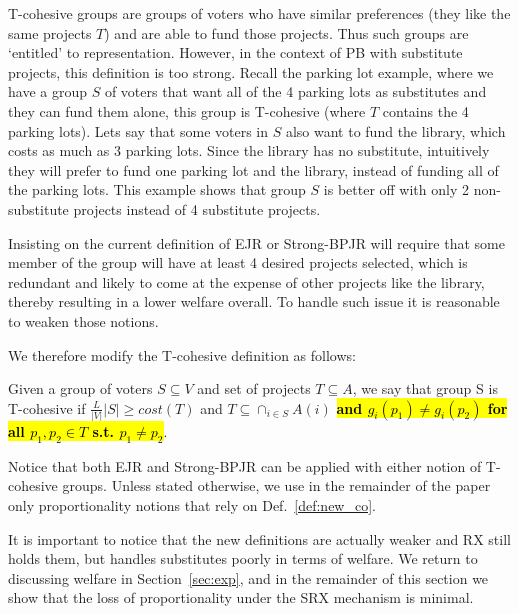 \documentclass[runningheads]{llncs}
\begin{document}
  T-cohesive groups  are  groups of voters who have similar preferences (they like the same projects $T$) and are able to  fund those projects. Thus such groups are `entitled' to representation.
However, in the context of PB with substitute projects, this definition is too strong. Recall the parking lot example, where we have a group $S$ of voters that want all of the 4 parking lots as substitutes and they can fund them alone, this group is T-cohesive (where $T$ contains the 4 parking lots). Lets say that some voters in $S$ also want to fund the library, which costs as much as 3 parking lots. Since the library has no  substitute, intuitively they will prefer to fund one parking lot and the library, instead of funding all of the parking lots.
This example shows that group $S$ is better off with only 2 non-substitute projects instead of 4 substitute projects.

Insisting on the current definition of EJR or Strong-BPJR will require that some member of the group will have at least 4 desired projects selected, which is redundant and likely to come at the expense of other projects like the library, thereby resulting in a lower welfare overall. To handle such issue it is reasonable to weaken those notions.

We therefore modify the T-cohesive definition as follows:


\begin{definition}\label{def:new_co} Given a group of voters $S\subseteq V$ and set of projects $T\subseteq A$, we say that group S is T-cohesive if $\frac{L}{|V|}|S|\geq cost(T)$ and $T\subseteq \cap_{i\in S}A(i)$ \hl{\textbf{and $g_i(p_1)\neq g_i(p_2)$ for all $p_1,p_2\in T$ s.t. $p_1\neq p_2$}}.
\end{definition}

Notice that both EJR and Strong-BPJR can be applied with either notion of T-cohesive groups. Unless stated otherwise, we use in the remainder of the paper only proportionality notions that rely on Def.~\ref{def:new_co}.

It is important to notice that the new definitions are actually weaker and RX still holds them, but handles substitutes poorly in terms of welfare. We return to discussing  welfare in Section~\ref{sec:exp}, and in the remainder of this section we show that the loss of proportionality under the SRX mechanism is minimal.
\end{document}
